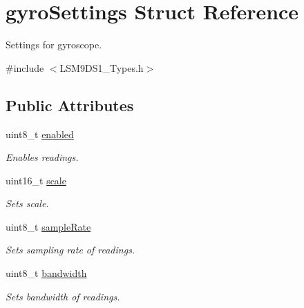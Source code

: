\hypertarget{structgyroSettings}{}\section{gyro\+Settings Struct Reference}
\label{structgyroSettings}


Settings for gyroscope.  




{\ttfamily \#include $<$L\+S\+M9\+D\+S1\+\_\+\+Types.\+h$>$}

\subsection*{Public Attributes}
\begin{DoxyCompactItemize}
\item 
\mbox{\label{structgyroSettings_ac9c769eeefed971baac74a7b81b25e7b}} 
uint8\+\_\+t \hyperlink{structgyroSettings_ac9c769eeefed971baac74a7b81b25e7b}{enabled}
\begin{DoxyCompactList}\small\item\em Enables readings. \end{DoxyCompactList}\item 
\mbox{\label{structgyroSettings_a70ced5c47e97d4dd6770954117ad3a9f}} 
uint16\+\_\+t \hyperlink{structgyroSettings_a70ced5c47e97d4dd6770954117ad3a9f}{scale}
\begin{DoxyCompactList}\small\item\em Sets scale. \end{DoxyCompactList}\item 
\mbox{\label{structgyroSettings_a58ebac4d1f242d6b129570396a7355b0}} 
uint8\+\_\+t \hyperlink{structgyroSettings_a58ebac4d1f242d6b129570396a7355b0}{sample\+Rate}
\begin{DoxyCompactList}\small\item\em Sets sampling rate of readings. \end{DoxyCompactList}\item 
\mbox{\label{structgyroSettings_ac3f0782333ec55165c1f589d445ba374}} 
uint8\+\_\+t \hyperlink{structgyroSettings_ac3f0782333ec55165c1f589d445ba374}{bandwidth}
\begin{DoxyCompactList}\small\item\em Sets bandwidth of readings. \end{DoxyCompactList}\item 

\end{DoxyCompactItemize}
